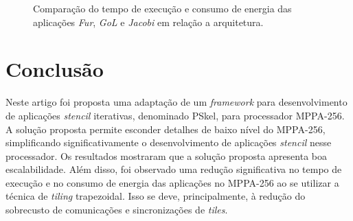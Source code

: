 \documentclass[12pt]{article}
\newcommand{\pskel}{PSkel\xspace}
\newcommand{\mppa}{MPPA-256\xspace}
\newcommand{\stencil}{\textit{stencil}\xspace}
\begin{document}
\begin{figure}[t]
	\centering
    \qquad
	\caption{Comparação do tempo de execução e consumo de energia das aplicações \textit{Fur}, \textit{GoL} e \textit{Jacobi} em relação a arquitetura.}
	\label{fig:comparison-time}
\end{figure}

\section{Conclusão}
\label{sec:conclusao}

Neste artigo foi proposta uma adaptação de um \textit{framework} para
desenvolvimento de aplicações \stencil iterativas, denominado \pskel, para
processador \mppa. A solução proposta permite esconder detalhes de baixo nível
do \mppa, simplificando significativamente o desenvolvimento de aplicações
\stencil nesse processador. Os resultados mostraram que a solução proposta
apresenta boa escalabilidade. Além disso, foi observado uma redução
significativa no tempo de execução e no consumo de energia das aplicações no
\mppa ao se utilizar a técnica de \textit{tiling} trapezoidal. Isso se deve,
principalmente, à redução do sobrecusto de comunicações e sincronizações de
\textit{tiles}.
\end{document}
